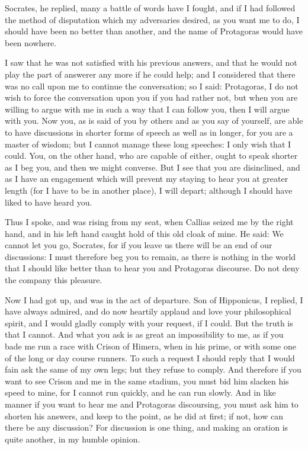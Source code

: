 \documentclass[11pt,letter]{article}
\begin{document}
\par  Socrates, he replied, many a battle of words have I fought, and if I had followed the method of disputation which my adversaries desired, as you want me to do, I should have been no better than another, and the name of Protagoras would have been nowhere.

\par  I saw that he was not satisfied with his previous answers, and that he would not play the part of answerer any more if he could help; and I considered that there was no call upon me to continue the conversation; so I said: Protagoras, I do not wish to force the conversation upon you if you had rather not, but when you are willing to argue with me in such a way that I can follow you, then I will argue with you. Now you, as is said of you by others and as you say of yourself, are able to have discussions in shorter forms of speech as well as in longer, for you are a master of wisdom; but I cannot manage these long speeches: I only wish that I could. You, on the other hand, who are capable of either, ought to speak shorter as I beg you, and then we might converse. But I see that you are disinclined, and as I have an engagement which will prevent my staying to hear you at greater length (for I have to be in another place), I will depart; although I should have liked to have heard you.

\par  Thus I spoke, and was rising from my seat, when Callias seized me by the right hand, and in his left hand caught hold of this old cloak of mine. He said: We cannot let you go, Socrates, for if you leave us there will be an end of our discussions: I must therefore beg you to remain, as there is nothing in the world that I should like better than to hear you and Protagoras discourse. Do not deny the company this pleasure.

\par  Now I had got up, and was in the act of departure. Son of Hipponicus, I replied, I have always admired, and do now heartily applaud and love your philosophical spirit, and I would gladly comply with your request, if I could. But the truth is that I cannot. And what you ask is as great an impossibility to me, as if you bade me run a race with Crison of Himera, when in his prime, or with some one of the long or day course runners. To such a request I should reply that I would fain ask the same of my own legs; but they refuse to comply. And therefore if you want to see Crison and me in the same stadium, you must bid him slacken his speed to mine, for I cannot run quickly, and he can run slowly. And in like manner if you want to hear me and Protagoras discoursing, you must ask him to shorten his answers, and keep to the point, as he did at first; if not, how can there be any discussion? For discussion is one thing, and making an oration is quite another, in my humble opinion.
\end{document}
